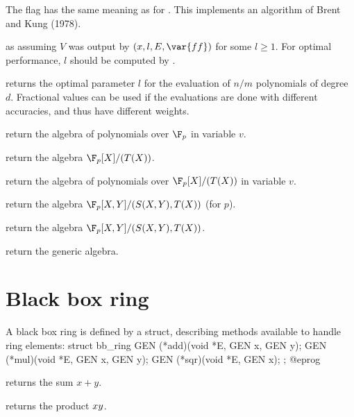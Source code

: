 The flag  has the same meaning as for . This
implements an algorithm of Brent and Kung (1978).

as  assuming $V$ was output by
$(x, l, E, \var{ff})$ for some $l\geq 1$. For optimal
performance, $l$ should be computed by .

 returns the optimal
parameter $l$ for the evaluation of $n/m$ polynomials of degree $d$.
Fractional values can be used if the evaluations are done with different
accuracies, and thus have different weights.


return the algebra of polynomials over $\F_p$ in variable $v$.

return the algebra $\F_p[X]/(T(X))$.

return the algebra of polynomials over $\F_p[X]/(T(X))$ in variable $v$.

return the algebra $\F_p[X,Y]/(S(X,Y),T(X))$ (for  $p$).

return the algebra $\F_p[X,Y]/(S(X,Y),T(X))$.

return the generic algebra.

\section{Black box ring}

A black box ring is defined by a  struct, describing methods
available to handle ring elements:
\bprog
struct bb_ring
{
  GEN (*add)(void *E, GEN x, GEN y);
  GEN (*mul)(void *E, GEN x, GEN y);
  GEN (*sqr)(void *E, GEN x);
};
@eprog

 returns the sum $x+y$.

 returns the product $x\*y$.

